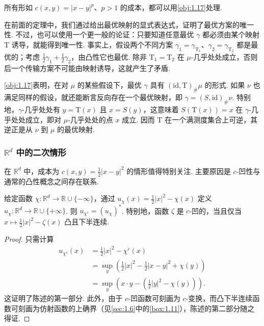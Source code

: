 \begin{remark}\label{obj:1.18}
所有形如 $c(x,y)=|x-y|^p$、$p>1$ 的成本，都可以用\autoref{obj:1.17}处理.
\end{remark}

\begin{remark}\label{obj:1.19}
在前面的定理中，我们通过给出最优映射的显式表达式，证明了最优方案的唯一性. 不过，也可以使用一个更一般的论证：只要知道任意最优 $\gamma$ 都必须由某个映射 $\mathrm{T}$ 诱导，就能得到唯一性. 事实上，假设两个不同方案 $\gamma_1=\gamma_{\mathrm{T}_1}$、$\gamma_2=\gamma_{\mathrm{T}_2}$ 都是最优的；考虑 $\frac12\gamma_1+\frac12\gamma_2$，由凸性它也最优. 除非 $\mathrm{T}_1=\mathrm{T}_2$ 在 $\mu$-几乎处处成立，否则后一个传输方案不可能由映射诱导，这就产生了矛盾.
\end{remark}

\begin{remark}\label{obj:1.20}
\autoref{obj:1.17}表明，在对 $\mu$ 的某些假设下，最优 $\gamma$ 具有 $(\mathrm{id},\mathrm{T})_\#\mu$ 的形式. 如果 $\nu$ 也满足同样的假设，就还能断言反向存在一个最优映射，即 $\gamma=(S,\mathrm{id})_\#\nu$. 特别地，$\gamma$-几乎处处有 $y=\mathrm{T}(x)$ 且 $x=S(y)$，这意味着 $S(\mathrm{T}(x))=x$ 在 $\gamma$-几乎处处成立，即对 $\mu$-几乎处处的点 $x$ 成立. 因而 $\mathrm{T}$ 在一个满测度集合上可逆，其逆正是从 $\nu$ 到 $\mu$ 的最优映射.
\end{remark}

\subsubsection[欧氏空间中的二次情形]{$\mathbb R^d$ 中的二次情形}\label{sec:1.3.1}

在 $\mathbb R^d$ 中，成本为 $c(x,y)=\frac12|x-y|^2$ 的情形值得特别关注. 主要原因是 $c$-凹性与通常的凸性概念之间存在联系.

\begin{proposition}\label{obj:1.21}
给定函数 $\chi:\mathbb R^d\to\mathbb R\cup\{-\infty\}$，通过 $u_\chi(x)=\frac12|x|^2-\chi(x)$ 定义 $u_\chi:\mathbb R^d\to\mathbb R\cup\{+\infty\}$. 则 $u_{\chi^c}=(u_\chi)^*$. 特别地，函数 $\zeta$ 是 $c$-凹的，当且仅当 $x\mapsto\frac12|x|^2-\zeta(x)$ 凸且下半连续.
\end{proposition}
\begin{proof}
只需计算
\begin{equation*}
\begin{aligned}
u_{\chi^c}(x)
&=\frac12|x|^2-\chi^c(x)\\
&=\sup_y\left(\frac12|x|^2-\frac12|x-y|^2+\chi(y)\right)\\
&=\sup_y\left(x\cdot y-\left(\frac12|y|^2-\chi(y)\right)\right).
\end{aligned}
\end{equation*}
这证明了陈述的第一部分. 此外，由于 $c$-凹函数可刻画为 $c$-变换，而凸下半连续函数可刻画为仿射函数的上确界（见\autoref{sec:1.6}中的\autoref{box:1.11}），陈述的第二部分随之得证.
\end{proof}

